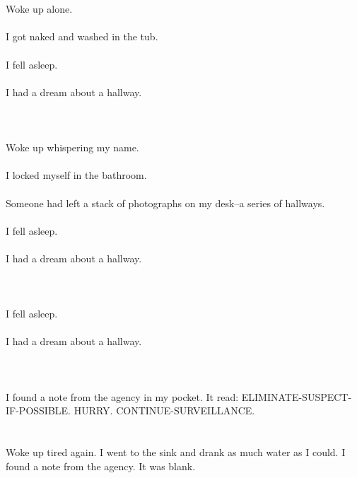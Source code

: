 \documentclass{article}
\begin{document}
    \section{}
    Woke up alone.\\\\I got naked and washed in the tub.\\\\I fell asleep.\\\\I had a dream about a hallway.\\\\ 
    \newpage
    
    \section{}
    Woke up whispering my name.\\\\I locked myself in the bathroom.\\\\Someone had left a stack of photographs on my desk--a series of hallways.\\\\I fell asleep.\\\\I had a dream about a hallway.\\\\ 
    \newpage
    
    \section{}
    I fell asleep.\\\\I had a dream about a hallway.\\\\ 
    \newpage
    
    \section{}
    I found a note from the agency in my pocket. It read: ELIMINATE-SUSPECT-IF-POSSIBLE. HURRY. CONTINUE-SURVEILLANCE.  
    \newpage
    
    \section{}
    Woke up tired again. I went to the sink and drank as much water as I could. I found a note from the agency. It was blank.  
    \newpage
    
\end{document}
